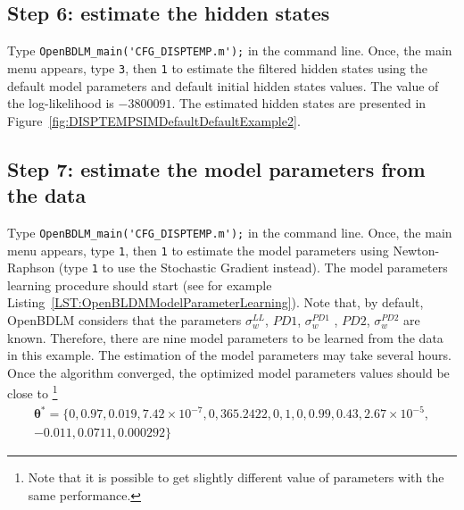 \subsection{Step 6: estimate the hidden states}

Type \colorbox{light-gray}{\lstinline[basicstyle = \mlttfamily \small, backgroundcolor = \color{light-gray}]!OpenBDLM_main('CFG_DISPTEMP.m');!} in the \MATLAB{} command line.
Once, the main menu appears, type  \colorbox{light-gray}{\lstinline[basicstyle = \mlttfamily \small, backgroundcolor = \color{light-gray}]!3!}, then \colorbox{light-gray}{\lstinline[basicstyle = \mlttfamily \small, backgroundcolor = \color{light-gray}]!1!} to estimate the filtered hidden states using the default model parameters and default initial hidden states values.
The value of the log-likelihood is $-3800091$.
The estimated hidden states are presented in Figure~\ref{fig:DISPTEMPSIMDefaultDefaultExample2}.


\subsection{Step 7: estimate the model parameters from the data}

Type \colorbox{light-gray}{\lstinline[basicstyle = \mlttfamily \small, backgroundcolor = \color{light-gray}]!OpenBDLM_main('CFG_DISPTEMP.m');!} in the \MATLAB{} command line.
Once, the main menu appears, type  \colorbox{light-gray}{\lstinline[basicstyle = \mlttfamily \small, backgroundcolor = \color{light-gray}]!1!}, then \colorbox{light-gray}{\lstinline[basicstyle = \mlttfamily \small, backgroundcolor = \color{light-gray}]!1!} to estimate the model parameters using Newton-Raphson (type  \colorbox{light-gray}{\lstinline[basicstyle = \mlttfamily \small, backgroundcolor = \color{light-gray}]!1!} to use the Stochastic Gradient instead).
The model parameters learning procedure should start (see for example Listing~\ref{LST:OpenBLDMModelParameterLearning}).
Note that, by default, OpenBDLM considers that the parameters $\sigma_{w}^{LL}$, $PD1$, $\sigma_{w}^{PD1}$ , $PD2$, $\sigma_{w}^{PD2}$ are known.
Therefore, there are nine model parameters to be learned from the data in this example.
The estimation of the model parameters may take several hours.
Once the algorithm converged, the optimized model parameters values should be close to  \footnote{Note that it is possible to get slightly different value of parameters with the same performance.}
\begin{gather*}
 \bm\theta^{\text{*}}=\{0, 0.97, 0.019, 7.42\times10^{-7}, 0, 365.2422, 0, 1, 0, 0.99, 0.43, 2.67\times10^{-5},  \\
 -0.011, 0.0711, 0.000292 \}
\end{gather*}



